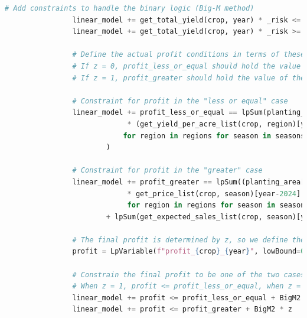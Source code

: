 \documentclass{cumcmthesis}
\begin{document}
\begin{appendices}
\begin{lstlisting}[language=python]
                # Add constraints to handle the binary logic (Big-M method)
                linear_model += get_total_yield(crop, year) * _risk <= get_expected_sales_list(crop, '第一季')[year-2024] + get_expected_sales_list(crop, '第二季')[year-2024] + BigM1 * (1 - z)
                linear_model += get_total_yield(crop, year) * _risk >= get_expected_sales_list(crop, '第一季')[year-2024] + get_expected_sales_list(crop, '第二季')[year-2024] - BigM1 * z
    
                # Define the actual profit conditions in terms of these auxiliary variables
                # If z = 0, profit_less_or_equal should hold the value of the first branch
                # If z = 1, profit_greater should hold the value of the second branch
    
                # Constraint for profit in the "less or equal" case
                linear_model += profit_less_or_equal == lpSum(planting_area[(crop, region, year, season)]
                             * (get_yield_per_acre_list(crop, region)[year-2024] * get_price_list(crop, season)[year-2024] * _risk * sup_coef(crop, region, year, season) - get_cost_list(crop, region)[year-2024])
                            for region in regions for season in seasons
                        )
    
                # Constraint for profit in the "greater" case
                linear_model += profit_greater == lpSum((planting_area[(crop, region, year, season)] * get_yield_per_acre_list(crop, region)[year-2024] * sup_coef(crop, region, year, season) - get_expected_sales_list(crop, season)[year-2024] - get_cost_list(crop, region)[year-2024])
                             * get_price_list(crop, season)[year-2024] * (1 - reduction_factor) 
                             for region in regions for season in seasons) \
                        + lpSum(get_expected_sales_list(crop, season)[year-2024] * get_price_list(crop, season)[year-2024] for season in seasons)
    
                # The final profit is determined by z, so we define the overall profit
                profit = LpVariable(f"profit_{crop}_{year}", lowBound=0)
    
                # Constrain the final profit to be one of the two cases
                # When z = 1, profit <= profit_less_or_equal, when z = 0, profit <= profit_greater
                linear_model += profit <= profit_less_or_equal + BigM2 * (1 - z)
                linear_model += profit <= profit_greater + BigM2 * z
    

\end{lstlisting}
\end{appendices}
\end{document}
